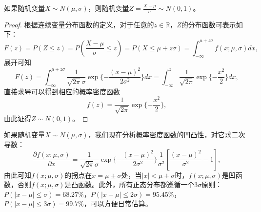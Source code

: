 \begin{corollary}
如果随机变量$X\sim N(\mu,\sigma)$，则随机变量$Z=\frac{X-\mu}{\sigma}\sim N(0,1)$。
\end{corollary}
\begin{proof}
根据连续变量分布函数的定义，对于任意的$z\in \mathbb R$，$Z$的分布函数可表示如下：
\[
    F(z) = P(Z\le z) = P(\frac{X-\mu}{\sigma} \le z) = P(X \le \mu + z\sigma)=\int_{-\infty}^{\mu + z\sigma} f(x;\mu,\sigma) dx,
\]
展开可知
\[
    F(z) = \int_{-\infty}^{\mu + z\sigma} \frac{1}{\sqrt{2\pi}\sigma} \exp\{-\frac{(x-\mu)^2}{2\sigma^2}\} dx = \int_{-\infty}^z \frac{1}{\sqrt{2\pi}} \exp\{-\frac{x^2}{2}\} dx,
\]
直接求导可以得到相应的概率密度函数
\[
    f(z) = \frac{1}{\sqrt{2\pi}} \exp\{-\frac{x^2}{2}\},
\]
由此证得$Z\sim N(0,1)$。
\end{proof}

如果随机变量$X\sim N(\mu,\sigma)$，我们现在分析概率密度函数的凹凸性，对它求二次导数：
\[
    \frac{\partial f(x;\mu,\sigma)}{\partial x} = \frac{1}{\sqrt{2\pi} \sigma} \exp\{-\frac{(x-\mu)^2}{2\sigma^2}\} \frac{1}{\sigma^2} [\frac{(x-\mu)^2}{\sigma^2} - 1],
\]
由此可知$f(x;\mu,\sigma)$的拐点在$x=\mu \pm\sigma$处，当$|x|<\mu +\sigma$时，$f(x;\mu,\sigma)$是凹函数，否则$f(x;\mu,\sigma)$是凸函数。此外，所有正态分布都遵循一个3$\sigma$原则：$P(|x-\mu|\le \sigma) = 68.27\%$，$P(|x-\mu|\le 2\sigma) = 95.45\%$，$P(|x-\mu|\le 3\sigma) = 99.7\%$，可以方便日常估算。

